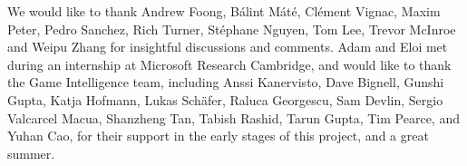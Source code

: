 \begin{ack}

We would like to thank Andrew Foong, Bálint Máté, Clément Vignac, Maxim Peter, Pedro Sanchez, Rich Turner, Stéphane Nguyen, Tom Lee, Trevor McInroe and Weipu Zhang for insightful discussions and comments.
Adam and Eloi met during an internship at Microsoft Research Cambridge, and would like to thank the Game Intelligence team, including Anssi Kanervisto, Dave Bignell, Gunshi Gupta, Katja Hofmann, Lukas Schäfer, Raluca Georgescu, Sam Devlin, Sergio Valcarcel Macua, Shanzheng Tan, Tabish Rashid, Tarun Gupta, Tim Pearce, and Yuhan Cao, for their support in the early stages of this project, and a great summer.

\end{ack}
